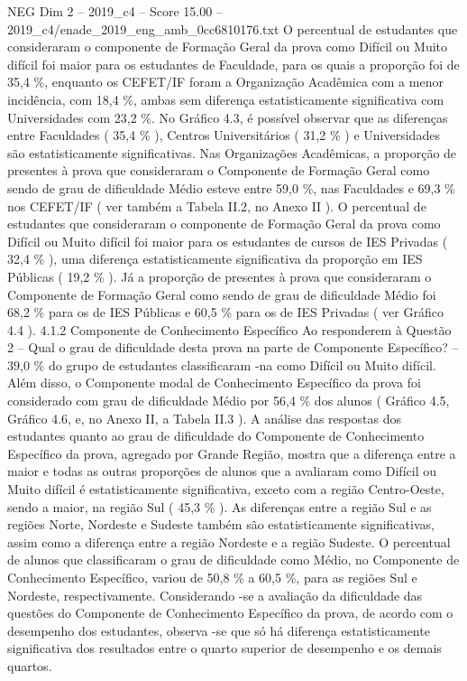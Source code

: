 \begin{textsample}{NEG Dim 2 – 2019\_c4 – Score 15.00 – 2019\_c4/enade\_2019\_eng\_amb\_0cc6810176.txt}
O percentual de estudantes que consideraram o componente de Formação Geral da prova como Difícil ou Muito difícil foi maior para os estudantes de Faculdade, para os quais a proporção foi de 35,4 \%, enquanto os CEFET/IF foram a Organização Acadêmica com a menor incidência, com 18,4 \%, ambas sem diferença estatisticamente significativa com Universidades com 23,2 \%.
No Gráfico 4.3, é possível observar que as diferenças entre Faculdades ( 35,4 \% ), Centros Universitários ( 31,2 \% ) e Universidades são estatisticamente significativas.
Nas Organizações Acadêmicas, a proporção de presentes à prova que consideraram o Componente de Formação Geral como sendo de grau de dificuldade Médio esteve entre 59,0 \%, nas Faculdades e 69,3 \% nos CEFET/IF ( ver também a Tabela II.2, no Anexo II ).
O percentual de estudantes que consideraram o componente de Formação Geral da prova como Difícil ou Muito difícil foi maior para os estudantes de cursos de IES Privadas ( 32,4 \% ), uma diferença estatisticamente significativa da proporção em IES Públicas ( 19,2 \% ).
Já a proporção de presentes à prova que consideraram o Componente de Formação Geral como sendo de grau de dificuldade Médio foi 68,2 \% para os de IES Públicas e 60,5 \% para os de IES Privadas ( ver Gráfico 4.4 ). 4.1.2 Componente de Conhecimento Específico Ao responderem à Questão 2 – Qual o grau de dificuldade desta prova na parte de Componente Específico? – 39,0 \% do grupo de estudantes classificaram -na como Difícil ou Muito difícil.
Além disso, o Componente modal de Conhecimento Específico da prova foi considerado com grau de dificuldade Médio por 56,4 \% dos alunos ( Gráfico 4.5, Gráfico 4.6, e, no Anexo II, a Tabela II.3 ).
A análise das respostas dos estudantes quanto ao grau de dificuldade do Componente de Conhecimento Específico da prova, agregado por Grande Região, mostra que a diferença entre a maior e todas as outras proporções de alunos que a avaliaram como Difícil ou Muito difícil é estatisticamente significativa, exceto com a região Centro-Oeste, sendo a maior, na região Sul ( 45,3 \% ).
As diferenças entre a região Sul e as regiões Norte, Nordeste e Sudeste também são estatisticamente significativas, assim como a diferença entre a região Nordeste e a região Sudeste.
O percentual de alunos que classificaram o grau de dificuldade como Médio, no Componente de Conhecimento Específico, variou de 50,8 \% a 60,5 \%, para as regiões Sul e Nordeste, respectivamente.
Considerando -se a avaliação da dificuldade das questões do Componente de Conhecimento Específico da prova, de acordo com o desempenho dos estudantes, observa -se que só há diferença estatisticamente significativa dos resultados entre o quarto superior de desempenho e os demais quartos.

\end{textsample}
